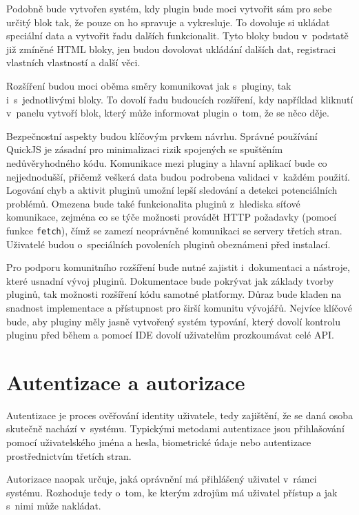 Podobně bude vytvořen systém, kdy plugin bude moci vytvořit sám pro sebe určitý blok tak, že pouze on ho spravuje a vykresluje.
To dovoluje si ukládat speciální data a vytvořit řadu dalších funkcionalit.
Tyto bloky budou v~podstatě již zmíněné HTML bloky, jen budou dovolovat ukládání dalších dat, registraci vlastních vlastností a další věci.

Rozšíření budou moci oběma směry komunikovat jak s~pluginy, tak i~s~jednotlivými bloky.
To dovolí řadu budoucích rozšíření, kdy například kliknutí v~panelu vytvoří blok, který může informovat plugin o~tom, že se něco děje.

Bezpečnostní aspekty budou klíčovým prvkem návrhu.
Správné používání QuickJS je zásadní pro minimalizaci rizik spojených se spuštěním nedůvěryhodného kódu.
Komunikace mezi pluginy a hlavní aplikací bude co nejjednodušší, přičemž veškerá data budou podrobena validaci v~každém použití.
Logování chyb a aktivit pluginů umožní lepší sledování a detekci potenciálních problémů.
Omezena bude také funkcionalita pluginů z~hlediska síťové komunikace, zejména co se týče možnosti provádět HTTP požadavky (pomocí funkce \texttt{fetch}), čímž se zamezí neoprávněné komunikaci se servery třetích stran.
Uživatelé budou o~speciálních povoleních pluginů obeznámeni před instalací.

Pro podporu komunitního rozšíření bude nutné zajistit i~dokumentaci a nástroje, které usnadní vývoj pluginů. 
Dokumentace bude pokrývat jak základy tvorby pluginů, tak možnosti rozšíření kódu samotné platformy. 
Důraz bude kladen na snadnost implementace a přístupnost pro širší komunitu vývojářů.
Nejvíce klíčové bude, aby pluginy měly jasně vytvořený systém typování, který dovolí kontrolu pluginu před během a pomocí IDE dovolí uživatelům prozkoumávat celé API.

\section{Autentizace a autorizace}\label{text:navrh/auth}

Autentizace je proces ověřování identity uživatele, tedy zajištění, že se daná osoba skutečně nachází v~systému. 
Typickými metodami autentizace jsou přihlašování pomocí uživatelského jména a hesla, biometrické údaje nebo autentizace prostřednictvím třetích stran.

Autorizace naopak určuje, jaká oprávnění má přihlášený uživatel v~rámci systému.
Rozhoduje tedy o~tom, ke kterým zdrojům má uživatel přístup a jak s~nimi může nakládat.

